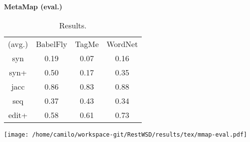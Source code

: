 \begin{center}\textbf{\Large MetaMap (eval.)}\end{center}
\begin{center}\begin{table}[p]\centering
\begin{tabular}{cccc}
(avg.) & BabelFly & TagMe & WordNet\\ 
syn & 0.19 & 0.07 & 0.16\\ 
syn+ & 0.50 & 0.17 & 0.35\\ 
jacc & 0.86 & 0.83 & 0.88\\ 
seq & 0.37 & 0.43 & 0.34\\ 
edit+ & 0.58 & 0.61 & 0.73
\end{tabular}\caption{Results.}\end{table}\end{center}



\vspace{0.2cm}

\begin{center}
\texttt{[image: /home/camilo/workspace-git/RestWSD/results/tex/mmap-eval.pdf]}
\end{center}
\newpage
